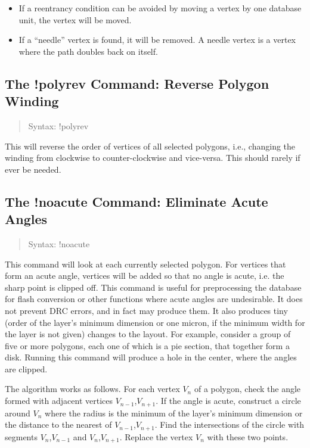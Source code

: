 \begin{itemize}
\item{If a reentrancy condition can be avoided by moving a vertex by
 one database unit, the vertex will be moved.}
\item{If a ``needle'' vertex is found, it will be removed.  A needle
 vertex is a vertex where the path doubles back on itself.}
\end{itemize}

\subsection{The {\cb !polyrev} Command: Reverse Polygon Winding}
\begin{quote}
Syntax: {\vt !polyrev}
\end{quote}
This will reverse the order of vertices of all selected polygons,
i.e., changing the winding from clockwise to counter-clockwise and
vice-versa.  This should rarely if ever be needed.

\subsection{The {\cb !noacute} Command: Eliminate Acute Angles}
\begin{quote}
Syntax: {\vt !noacute}
\end{quote}
This command will look at each currently selected polygon.  For
vertices that form an acute angle, vertices will be added so that no
angle is acute, i.e.  the sharp point is clipped off.  This command is
useful for preprocessing the database for flash conversion or other
functions where acute angles are undesirable.  It does not prevent DRC
errors, and in fact may produce them.  It also produces tiny (order of
the layer's minimum dimension or one micron, if the minimum width for
the layer is not given) changes to the layout.  For example, consider
a group of five or more polygons, each one of which is a pie section,
that together form a disk.  Running this command will produce a hole
in the center, where the angles are clipped.

The algorithm works as follows.  For each vertex $V_n$ of a polygon,
check the angle formed with adjacent vertices $V_{n-1}$,$V_{n+1}$.  If
the angle is acute, construct a circle around $V_n$ where the radius
is the minimum of the layer's minimum dimension or the distance to the
nearest of $V_{n-1}$,$V_{n+1}$.  Find the intersections of the circle
with segments $V_n$,$V_{n-1}$ and $V_n$,$V_{n+1}$.  Replace the vertex
$V_n$ with these two points.

